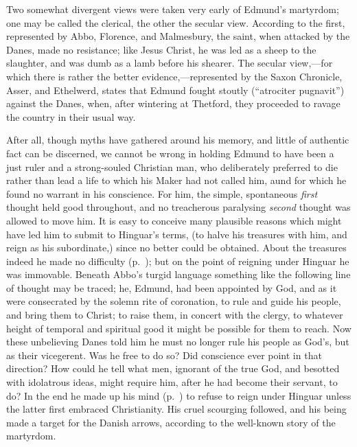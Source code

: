 \documentclass[10pt]{book}
\begin{document}
{Two  somewhat divergent views were taken very early of Edmund's martyrdom; one may be called the clerical, the other the secular view. According to the first, represented by Abbo, Florence, and Malmesbury, the saint, when attacked by the Danes, made no resistance; like Jesus Christ, he was led as a sheep to the slaughter, and was dumb as a lamb before his shearer. The secular view,---for which there is rather the better evidence,---represented by the Saxon Chronicle, Asser, and Ethelwerd, states that Edmund fought stoutly (``atrociter pugnavit'') against the Danes, when, after wintering at Thetford, they proceeded to ravage the country in their usual way.

After all, though myths have gathered around his memory, and little of authentic fact can be discerned, we cannot be wrong in holding Edmund to have been a just ruler and a strong-souled Christian man, who deliberately preferred to die rather than lead a life to which his Maker had not called him, aund for which he found no warrant in his conscience. For him, the simple, spontaneous \emph{first} thought held good throughout, and no treacherous paralysing \emph{second} thought was allowed to move him. It is easy to conceive many plausible reasons which might have led him to submit to Hinguar's terms, (to halve his treasures with him, and reign as his subordinate,) since no better could be obtained. About the treasures indeed he made no difficulty (p.\ ); but on the point of reigning under Hinguar he was immovable. Beneath Abbo's turgid language something like the following line of thought may be traced; he, Edmund, had been appointed by God, and as it were consecrated by the solemn rite of coronation, to rule and guide his people, and bring them to Christ; to raise them, in concert with the clergy, to whatever height of temporal and spiritual good it might be possible for them to reach. Now these unbelieving Danes told him he must no longer rule his people as God's, but as their vicegerent. Was he free to do so? Did conscience ever point in that direction? How could he tell what men, ignorant of the true God, and besotted with idolatrous ideas, might require him, after he had become their servant, to do? In the end he made up his mind (p.\ ) to refuse to reign under Hinguar unless the latter first embraced Christianity. His cruel scourging followed, and his being made a target for the Danish arrows, according to the well-known story of the martyrdom.

}
\end{document}
